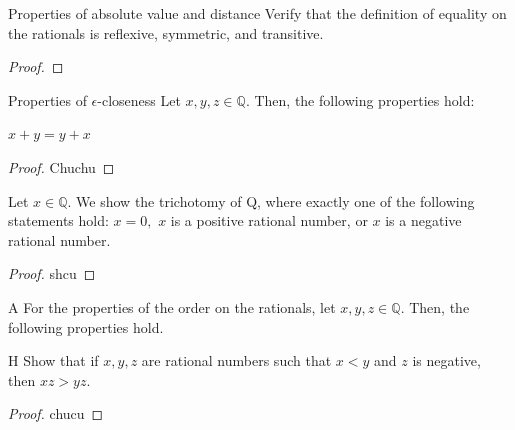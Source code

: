 \begin{problem}{Properties of absolute value and distance}
	Verify that the definition of equality on the rationals is reflexive, symmetric, and transitive.
\end{problem}
\begin{proof}
\end{proof}

\begin{problem}{Properties of $\epsilon$-closeness}
Let $x, y, z \in \mathbb{Q}$. Then, the following properties hold:
\end{problem}
\begin{proposition}
    $x + y = y + x$
\end{proposition}
\begin{proof}
    Chuchu
\end{proof}

\begin{problem}{}
    Let $x \in \mathbb{Q}.$ We show the trichotomy of Q, where exactly one of the following statements hold:
    $x = 0,$ $x$ is a positive rational number, or $x$ is a negative rational number.
\end{problem}
\begin{proof}
    shcu
\end{proof}

\begin{problem}{A}
    For the properties of the order on the rationals, let $x, y, z \in \mathbb{Q}.$ 
    Then, the following properties hold.
\end{problem}

\begin{problem}{H}
    Show that if $x, y, z$ are rational numbers such that $x < y$ and $z$ is negative, then $xz > yz.$
\end{problem}
\begin{proof}
    chucu
\end{proof}